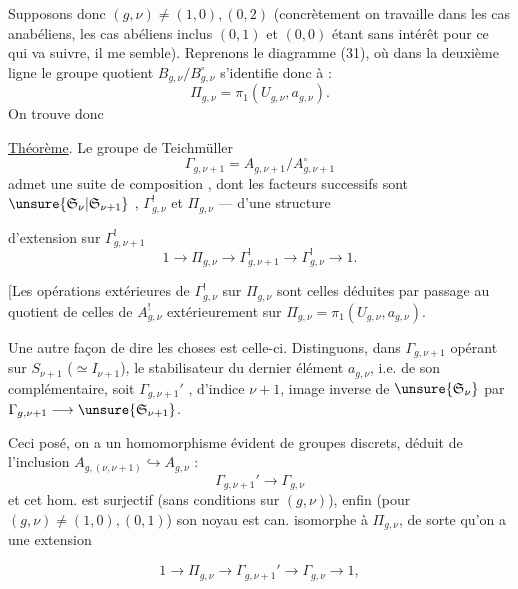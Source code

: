 Supposons donc $(g,\nu)\ne(1,0),(0,2)$ (concrètement on travaille dans les cas anabéliens, les cas  abéliens inclus $(0,1)$ et $(0,0)$ étant  sans intérêt pour ce qui va suivre, il me semble). Reprenons le diagramme (31), où dans la deuxième ligne le groupe quotient $B_{g,\nu}/B_{g,\nu}^{\circ}$ s'identifie donc à :
\[
\Pi_{g,\nu}=\pi_1(U_{g,\nu},a_{g,\nu}).
\]
On trouve donc

\uline{Théorème}. Le groupe de Teichmüller
\[
\Gamma_{g,\nu+1}=A_{g,\nu+1}/A_{g,\nu+1}^{\circ}
\]
admet une suite de composition , dont les facteurs successifs sont $\unsure{\mathfrak S_\nu|\mathfrak S_{\nu+1}}$ , $\Gamma_{g,\nu}^{!}$ et $\Pi_{g,\nu}$ ---  d'une structure

d'extension sur $\Gamma_{g,\nu+1}^{!}$
\[
\tag{41}
1\longrightarrow\Pi_{g,\nu}\longrightarrow\Gamma_{g,\nu+1}^{!}
\longrightarrow\Gamma_{g,\nu}^{!}\longrightarrow1.
\]

[Les opérations extérieures de $\Gamma_{g,\nu}^{!}$ sur $\Pi_{g,\nu}$ sont celles déduites par passage au quotient de celles de $A_{g,\nu}^{!}$   extérieurement sur $\Pi_{g,\nu}=\pi_1(U_{g,\nu},a_{g,\nu})$.

Une autre façon de dire les choses est celle-ci. Distinguons, dans $\Gamma_{g,\nu+1}$ opérant sur $S_{\nu+1}$  ($\simeq I_{\nu+1}$), le stabilisateur du dernier élément $a_{g,\nu}$, i.e. de son complémentaire, soit $\Gamma_{g,\nu+1}'$ ,  d'indice $\nu+1$, image inverse de $\unsure{\mathfrak S_\nu}$  par $\Gamma_{g,\nu+1}\longrightarrow\unsure{\mathfrak S_{\nu+1}}$.

Ceci posé, on a un homomorphisme évident de groupes discrets, déduit de l'inclusion  $A_{g,(\nu,\nu+1)}\hookrightarrow A_{g,\nu}$ :
\[
\tag{42}
\Gamma_{g,\nu+1}'\longrightarrow\Gamma_{g,\nu}
\]
et cet hom. est surjectif (sans conditions sur $(g,\nu)$), enfin (pour $(g,\nu)\ne(1,0),(0,1)$) son noyau est can. isomorphe à $\Pi_{g,\nu}$, de sorte qu'on a une extension


\[
\tag{43}
1\longrightarrow\Pi_{g,\nu}\longrightarrow\Gamma_{g,\nu+1}'
\longrightarrow\Gamma_{g,\nu}\longrightarrow1,
\]
